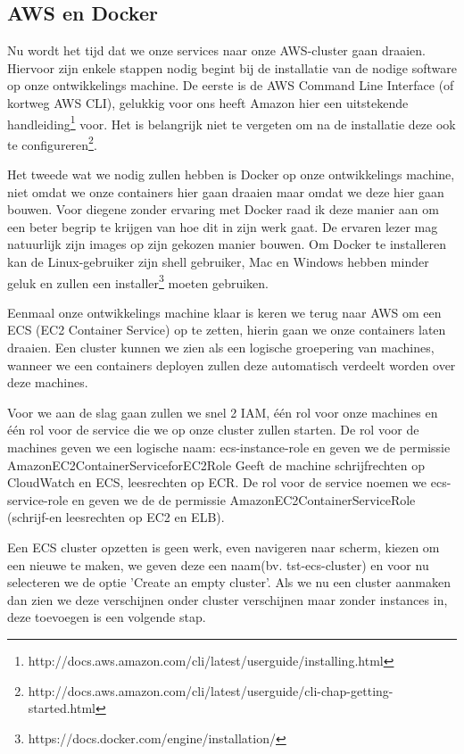 \documentclass{article}
\begin{document}
	\subsection{AWS en Docker}
	Nu wordt het tijd dat we onze services naar onze AWS-cluster gaan draaien. Hiervoor zijn enkele stappen nodig begint bij de installatie van de nodige software op onze ontwikkelings machine. De eerste is de AWS Command Line Interface (of kortweg AWS CLI), gelukkig voor ons heeft Amazon hier een uitstekende handleiding\footnote{http://docs.aws.amazon.com/cli/latest/userguide/installing.html}
	voor. Het is belangrijk niet te vergeten om na de installatie deze ook te configureren\footnote{http://docs.aws.amazon.com/cli/latest/userguide/cli-chap-getting-started.html}.
	\par
	Het tweede wat we nodig zullen hebben is Docker op onze ontwikkelings machine, niet omdat we onze containers hier gaan draaien maar omdat we deze hier gaan bouwen. Voor diegene zonder ervaring met Docker raad ik deze manier aan om een beter begrip te krijgen van hoe dit in zijn werk gaat. De ervaren lezer mag natuurlijk zijn images op zijn gekozen manier bouwen. Om Docker te installeren kan de Linux-gebruiker zijn shell gebruiker, Mac en Windows hebben minder geluk en zullen een installer\footnote{https://docs.docker.com/engine/installation/} moeten gebruiken.
	\par
	Eenmaal onze ontwikkelings machine klaar is keren we terug naar AWS om een ECS (EC2 Container Service) op te zetten, hierin gaan we onze containers laten draaien. Een cluster kunnen we zien als een logische groepering van machines, wanneer we een containers deployen zullen deze automatisch verdeelt worden over deze machines.
	\par
	Voor we aan de slag gaan zullen we snel 2 IAM, één rol voor onze machines en één rol voor de service die we op onze cluster zullen starten. De rol voor de machines geven we een logische naam: ecs-instance-role en geven we de permissie AmazonEC2ContainerServiceforEC2Role {Geeft de machine schrijfrechten op CloudWatch en ECS, leesrechten op ECR}. De rol voor de service noemen we ecs-service-role en geven we de de permissie AmazonEC2ContainerServiceRole (schrijf-en leesrechten op EC2 en ELB). 
	\par	
	 Een ECS cluster opzetten is geen werk, even navigeren naar scherm, kiezen om een nieuwe te maken, we geven deze een naam(bv. tst-ecs-cluster) en voor nu selecteren we de optie 'Create an empty cluster'. Als we nu een cluster aanmaken dan zien we deze verschijnen onder cluster verschijnen maar zonder instances in, deze toevoegen is een volgende stap.
\end{document}
